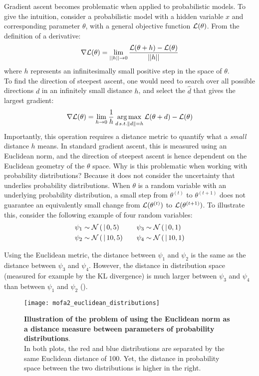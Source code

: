 Gradient ascent becomes problematic when applied to probabilistic models. To give the intuition, consider a probabilistic model with a hidden variable $x$ and corresponding parameter $\theta$, with a general objective function $\mathcal{L}(\theta)$. From the definition of a derivative:
\[
	\nabla \mathcal{L}(\theta) = \lim_{||h||\to0} \frac{\mathcal{L}(\theta + h) - \mathcal{L}(\theta)}{||h||}
\]
where $h$ represents an infinitesimally small positive step in the space of $\theta$.\\
To find the direction of steepest ascent, one would need to search over all possible directions $d$ in an infinitely small distance $h$, and select the $\hat{d}$ that gives the largest gradient:
\[
\nabla \mathcal{L}(\theta) = \lim_{h\to0} \frac{1}{h}\operatorname*{arg\,max}_{d \, s.t. \|d\|=h} \mathcal{L}(\theta+d) - \mathcal{L}(\theta)
\]
Importantly, this operation requires a distance metric to quantify what a \textit{small} distance $h$ means. In standard gradient ascent, this is measured using an Euclidean norm, and the direction of steepest ascent is hence dependent on the Euclidean geometry of the $\theta$ space. Why is this problematic when working with probability distributions? Because it does not consider the uncertainty that underlies probability distributions. When $\theta$ is a random variable with an underlying probability distribution, a small step from $\theta^{(t)}$ to $\theta^{(t+1)}$ does not guarantee an equivalently small change from $\mathcal{L}(\theta^{(t)})$ to $\mathcal{L}(\theta^{(t+1)})$. To illustrate this, consider the following example of four random variables:
\begin{equation}
	\begin{split}
		\psi_1 &\sim \mathcal{N}\left( \,|\, 0,5\right) \\
		\psi_2 &\sim \mathcal{N}\left( \,|\, 10,5\right)
	\end{split}
	\qquad
	\begin{split}
		\psi_3 &\sim \mathcal{N}\left( \,|\, 0,1\right) \\
		\psi_4 &\sim \mathcal{N}\left( \,|\, 10,1\right)
	\end{split}
\end{equation}

Using the Euclidean metric, the distance between $\psi_1$ and $\psi_2$ is the same as the distance between $\psi_3$ and $\psi_4$. However, the distance in distribution space (measured for example by the KL divergence) is much larger between $\psi_3$ and $\psi_4$ than between $\psi_1$ and $\psi_2$ ().

\begin{figure}[!h]
	\begin{center}
		\texttt{[image: mofa2\_euclidean\_distributions]}
		\caption{\textbf{Illustration of the problem of using the Euclidean norm as a distance measure between parameters of probability distributions}.\\
		In both plots, the red and blue distributions are separated by the same Euclidean distance of 100. Yet, the distance in probability space between the two distributions is higher in the right.
		}
		\label{fig:mofa2_euclidean_distributions}
	\end{center}
\end{figure}

